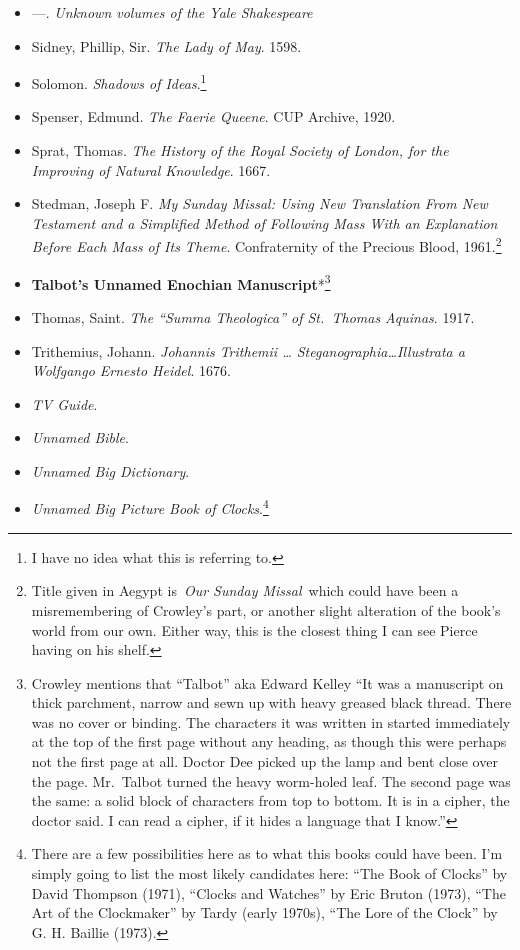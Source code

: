 \documentclass[12pt]{article}
\begin{document}
\begin{itemize}
\item
  ---. \emph{Unknown volumes of the Yale Shakespeare}
\item
  Sidney, Phillip, Sir. \emph{The Lady of May}. 1598.
\item
  Solomon. \emph{Shadows of Ideas}.\footnote{I have no idea what this is referring to.}
\item
  Spenser, Edmund. \emph{The Faerie Queene}. CUP Archive, 1920.
\item
  Sprat, Thomas. \emph{The History of the Royal Society of London, for the Improving of Natural Knowledge}. 1667.
\item
  Stedman, Joseph F. \emph{My Sunday Missal: Using New Translation From New Testament and a Simplified Method of Following Mass With an Explanation Before Each Mass of Its Theme}. Confraternity of the Precious Blood, 1961.\footnote{Title given in Aegypt is~\emph{Our Sunday Missal}~which could have been a misremembering of Crowley's part, or another slight alteration of the book's world from our own. Either way, this is the closest thing I can see Pierce having on his shelf.}
\item
  \textbf{Talbot's Unnamed Enochian Manuscript}*\footnote{Crowley mentions that ``Talbot'' aka Edward Kelley ``It was a manuscript on thick parchment, narrow and sewn up with heavy greased black thread. There was no cover or binding. The characters it was written in started immediately at the top of the first page without any heading, as though this were perhaps not the first page at all. Doctor Dee picked up the lamp and bent close over the page. Mr.~Talbot turned the heavy worm-holed leaf. The second page was the same: a solid block of characters from top to bottom. It is in a cipher, the doctor said. I can read a cipher, if it hides a language that I know.''}
\item
  Thomas, Saint. \emph{The ``Summa Theologica'' of St.~Thomas Aquinas}. 1917.
\item
  Trithemius, Johann. \emph{Johannis Trithemii \ldots{} Steganographia\ldots Illustrata a Wolfgango Ernesto Heidel}. 1676.
\item
  \emph{TV Guide}.
\item
  \emph{Unnamed Bible}.
\item
  \emph{Unnamed Big Dictionary}.
\item
  \emph{Unnamed Big Picture Book of Clocks}.\footnote{There are a few possibilities here as to what this books could have been. I'm simply going to list the most likely candidates here: ``The Book of Clocks'' by David Thompson (1971), ``Clocks and Watches'' by Eric Bruton (1973), ``The Art of the Clockmaker'' by Tardy (early 1970s), ``The Lore of the Clock'' by G. H. Baillie (1973).}

\end{itemize}
\end{document}
